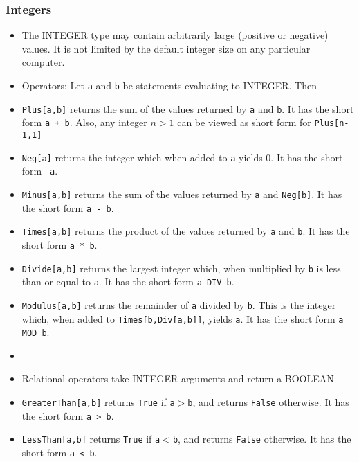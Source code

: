 \subsubsection{Integers}
\begin{itemize}
\item
The INTEGER type may contain arbitrarily large (positive or negative)
values.  It is not limited by the default integer size on any particular
computer.

\item
Operators:
Let \verb+a+ and \verb+b+ be statements evaluating to INTEGER. Then

\bd
\item
\verb+Plus[a,b]+ returns the sum of the values returned by
\verb+a+ and \verb+b+.  It has the short form \verb&a + b&.  Also,
any integer $n>1$ can be viewed as short form for \verb+Plus[n-1,1]+  
 
\item
\verb+Neg[a]+ returns the integer which when added to \verb+a+ yields
0.  It has the short form \verb&-a&.  
 
\item
\verb+Minus[a,b]+ returns the sum of the values returned by
\verb+a+ and \verb+Neg[b]+.  It has the short form \verb&a - b&.  

\item
\verb+Times[a,b]+ returns the product of the values returned by
\verb+a+ and \verb+b+.  It has the short form \verb+a * b+.

\item
\verb+Divide[a,b]+ returns the largest integer which, when
multiplied by \verb+b+ is less than or equal to \verb+a+.  It has the
short form \verb+a DIV b+.

\item
\verb+Modulus[a,b]+ returns the remainder of \verb+a+ divided by
\verb+b+.  This is the integer which, when added to
\verb+Times[b,Div[a,b]]+, yields \verb+a+.  It has the short form 
\verb+a MOD b+.
\item

\ed
\item
Relational operators take INTEGER arguments and
return a BOOLEAN
\bd
\item
\verb+GreaterThan[a,b]+ returns \verb+True+ if \verb+a+$>$\verb+b+, and
returns \verb+False+ otherwise.  It has the short form \verb+a > b+.

\item
\verb+LessThan[a,b]+ returns \verb+True+ if \verb+a+$<$\verb+b+, and
returns \verb+False+ otherwise.  It has the short form \verb+a < b+.


\end{itemize}
